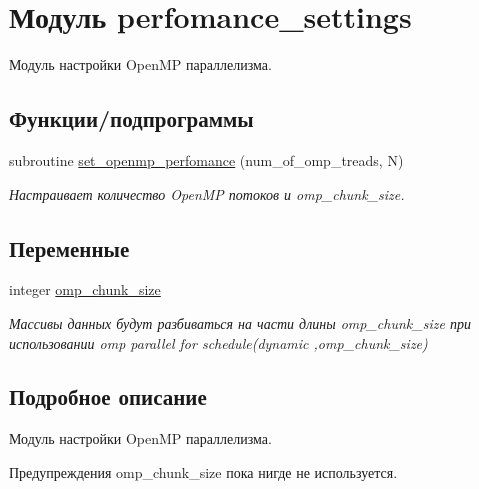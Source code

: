 \hypertarget{namespaceperfomance__settings}{}\section{Модуль perfomance\+\_\+settings}
\label{namespaceperfomance__settings}


Модуль настройки Open\+MP параллелизма.  


\subsection*{Функции/подпрограммы}
\begin{DoxyCompactItemize}
\item 
subroutine \mbox{\hyperlink{namespaceperfomance__settings_a50a101c3721ccc0da3b5867807ea6c70}{set\+\_\+openmp\+\_\+perfomance}} (num\+\_\+of\+\_\+omp\+\_\+treads, N)
\begin{DoxyCompactList}\small\item\em Настраивает количество Open\+MP потоков и omp\+\_\+chunk\+\_\+size. \end{DoxyCompactList}\end{DoxyCompactItemize}
\subsection*{Переменные}
\begin{DoxyCompactItemize}
\item 
integer \mbox{\hyperlink{namespaceperfomance__settings_a1632739c07471b87731fe9e33f69fcae}{omp\+\_\+chunk\+\_\+size}}
\begin{DoxyCompactList}\small\item\em Массивы данных будут разбиваться на части длины omp\+\_\+chunk\+\_\+size при использовании omp parallel for schedule(dynamic ,omp\+\_\+chunk\+\_\+size) \end{DoxyCompactList}\end{DoxyCompactItemize}


\subsection{Подробное описание}
Модуль настройки Open\+MP параллелизма. 

\begin{DoxyWarning}{Предупреждения}
omp\+\_\+chunk\+\_\+size пока нигде не используется. 
\end{DoxyWarning}


